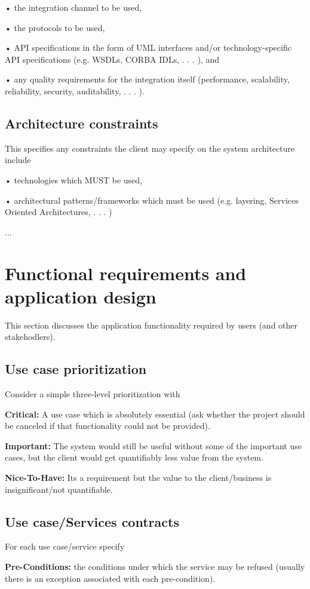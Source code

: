 \documentclass{scrreprt}
\begin{document}
• the integration channel to be used,

• the protocols to be used,


• API specifications in the form of UML interfaces and/or technology-specific API specifications (e.g. WSDLs, CORBA IDLs, . . . ), and

• any quality requirements for the integration itself (performance, scalability, reliability, security, auditability, . . . ).

\section{Architecture constraints}
	This specifies any constraints the client may specify on the system architecture include
	
• technologies which MUST be used,

• architectural patterns/frameworks which must be used (e.g. layering, Services Oriented Architectures, . . . )

...

\chapter{Functional requirements and application design}
This section discusses the application functionality required by users (and other stakehodlers).

\section{Use case prioritization}
Consider a simple three-level prioritization with

\textbf{Critical:} A use case which is absolutely essential (ask whether the project should be canceled if that functionality could not be provided).

\textbf{Important:} The system would still be useful without some of the important use cases, but the client would get quantifiably less value from the system.

\textbf{Nice-To-Have:} Its a requirement but the value to the client/business is insignificant/not quantifiable.

\section{Use case/Services contracts}
For each use case/service specify

\textbf{Pre-Conditions:} the conditions under which the service may be refused (usually there is an exception associated with each pre-condition).
\end{document}
